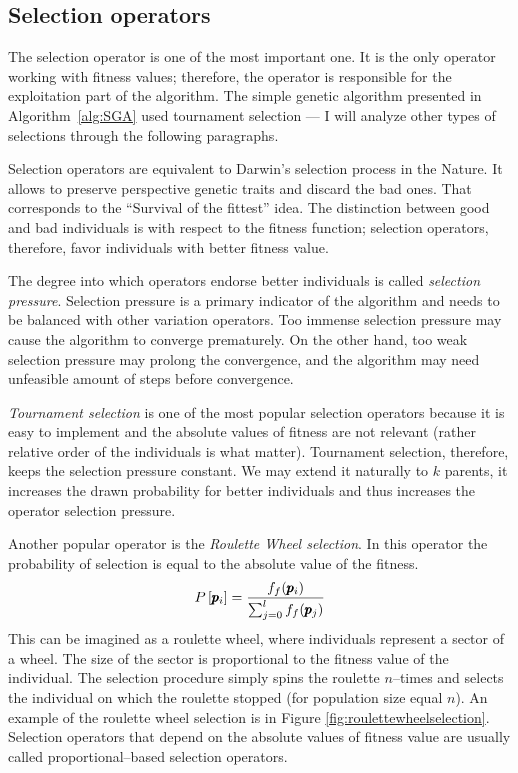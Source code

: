 \subsection{Selection operators}

The selection operator is one of the most important one. It is the only operator working with fitness values; therefore, the operator is responsible for the exploitation part of the algorithm. The simple genetic algorithm presented in Algorithm~\ref{alg:SGA} used tournament selection --- I will analyze other types of selections through the following paragraphs.

Selection operators are equivalent to Darwin's selection process in the Nature. It allows to preserve perspective genetic traits and discard the bad ones. That corresponds to the \enquote{Survival of the fittest} idea. The distinction between good and bad individuals is with respect to the fitness function; selection operators, therefore, favor individuals with better fitness value.

The degree into which operators endorse better individuals is called \emph{selection pressure}. Selection pressure is a primary indicator of the algorithm and needs to be balanced with other variation operators. Too immense selection pressure may cause the algorithm to converge prematurely. On the other hand, too weak selection pressure may prolong the convergence, and the algorithm may need unfeasible amount of steps before convergence.

\emph{Tournament selection} is one of the most popular selection operators because it is easy to implement and the absolute values of fitness are not relevant (rather relative order of the individuals is what matter). Tournament selection, therefore, keeps the selection pressure constant. We may extend it naturally to $k$ parents, it increases the drawn probability for better individuals and thus increases the operator selection pressure.

Another popular operator is the \emph{Roulette Wheel selection}. In this operator the probability of selection is equal to the absolute value of the fitness.
$$ P\left[\pmb{p}_i\right] = \frac{f_f(\pmb{p}_i)}{\sum_{j=0}^{l}f_f(\pmb{p}_j)} $$
This can be imagined as a roulette wheel, where individuals represent a sector of a wheel. The size of the sector is proportional to the fitness value of the individual. The selection procedure simply spins the roulette $n$--times and selects the individual on which the roulette stopped (for population size equal $n$). An example of the roulette wheel selection is in Figure \ref{fig:roulettewheelselection}. Selection operators that depend on the absolute values of fitness value are usually called proportional--based selection operators.

